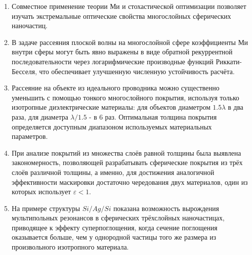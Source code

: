 {}  %
\mynobreakpar\begin{enumerate}
  \item Совместное применение теории Ми и стохастической оптимизации
    позволяет изучать экстремальные оптические свойства многослойных
    сферических наночастиц.
  \item В задаче рассеяния плоской волны на многослойной сфере
    коэффициенты Ми внутри сферы могут быть явно выражены в виде
    обратной рекуррентной последовательности через логарифмические
    производные функций Риккати-Бесселя, что обеспечивает улучшенную
    численную устойчивость расчёта. %
  \item Рассеяние на объекте из идеального проводника можно
    существенно уменьшить с помощью тонкого многослойного покрытия,
    используя только изотропные диэлектрические материалы: для
    объектов диаметром $1.5\lambda$ в два раза, для диаметра
    $\lambda/1.5$ - в 6 раз. Оптимальная толщина покрытия определяется
    доступным диапазоном используемых материальных параметров.
  \item 
    При анализе покрытий из множества слоёв равной толщины
    была выявлена закономерность, позволяющей разрабатывать
    сферические покрытия из трёх слоёв различной толщины, а именно,
    для достижения аналогичной эффективности маскировки достаточно
    чередования двух материалов, один из которых использует
    $\varepsilon<1$. 

  \item На примере структуры $Si/Ag/Si$ показана возможность
    вырождения мультипольных резонансов в сферических трёхслойных
    наночастицах, приводящее к эффекту суперпоглощения, когда сечение
    поглощения оказывается больше, чем у однородной частицы того же
    размера из произвольного изотропного материала.
\end{enumerate}


